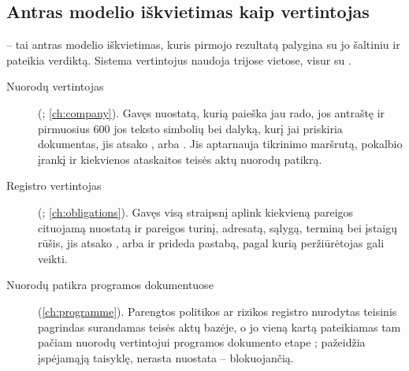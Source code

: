 \subsection{Antras modelio iškvietimas kaip vertintojas}\label{sec:control:judges}

 -- tai antras modelio iškvietimas, kuris pirmojo rezultatą palygina su jo
šaltiniu ir pateikia verdiktą. Sistema vertintojus naudoja trijose vietose, visur su
.

\begin{description}
  \item[Nuorodų vertintojas] (; \cref{ch:company}). Gavęs
    nuostatą, kurią paieška jau rado, jos antraštę ir pirmuosius 600 jos teksto simbolių bei
    dalyką, kurį jai priskiria dokumentas, jis atsako ,  arba
    . Jis aptarnauja tikrinimo maršrutą, pokalbio įrankį 
    ir kiekvienos ataskaitos teisės aktų nuorodų patikrą.
  \item[Registro vertintojas] (; \cref{ch:obligations}).
    Gavęs visą straipsnį aplink kiekvieną pareigos cituojamą nuostatą ir pareigos turinį,
    adresatą, sąlygą, terminą bei įstaigų rūšis, jis atsako , 
    arba  ir prideda pastabą, pagal kurią peržiūrėtojas gali veikti.
  \item[Nuorodų patikra programos dokumentuose] (\cref{ch:programme}). Parengtos politikos
    ar rizikos registro nurodytas teisinis pagrindas surandamas teisės aktų bazėje, o jo
     vieną kartą pateikiamas tam pačiam nuorodų vertintojui programos dokumento
    etape ;  pažeidžia įspėjamąją taisyklę, nerasta
    nuostata -- blokuojančią.
\end{description}

